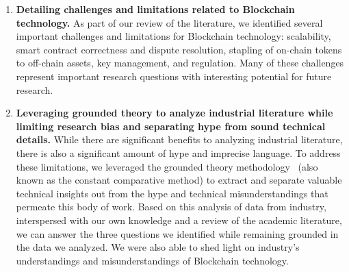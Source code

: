 \begin{enumerate}
	\item \textbf{Detailing challenges and limitations related to Blockchain technology.}
	As part of our review of the literature, we identified several important challenges and limitations for Blockchain technology: scalability, smart contract correctness and dispute resolution, stapling of on-chain tokens to off-chain assets, key management, and regulation.
	Many of these challenges represent important research questions with interesting potential for future research.


	\item \textbf{Leveraging grounded theory to analyze industrial literature while limiting research bias and separating hype from sound technical details.}
	While there are significant benefits to analyzing industrial literature, there is also a significant amount of hype and imprecise language.
	To address these limitations, we leveraged the grounded theory methodology~\cite{glaser1965constant,strauss1990basics,corbin1990grounded} (also known as the constant comparative method) to extract and separate valuable technical insights out from the hype and technical misunderstandings that permeate this body of work.
	Based on this analysis of data from industry, interspersed with our own knowledge and a review of the academic literature, we can answer the three questions we identified while remaining grounded in the data we analyzed.
	We were also able to shed light on industry's understandings and misunderstandings of Blockchain technology. 
	
	
\end{enumerate}
